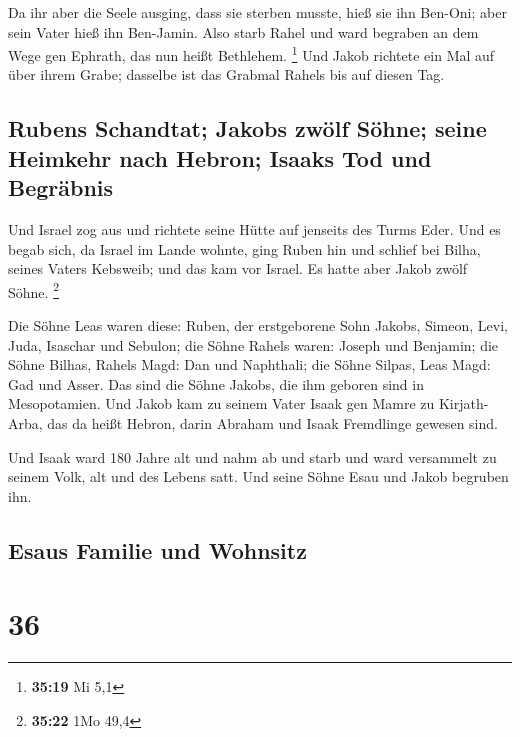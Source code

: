  Da ihr aber die Seele ausging, dass sie sterben musste,
hieß sie ihn Ben-Oni; aber sein Vater hieß ihn Ben-Jamin.
 Also starb Rahel und ward begraben an dem Wege gen
Ephrath, das nun heißt Bethlehem. \footnote{\textbf{35:19} Mi 5,1}
 Und Jakob richtete ein Mal auf über ihrem Grabe;
dasselbe ist das Grabmal Rahels bis auf diesen Tag.

\hypertarget{rubens-schandtat-jakobs-zwuxf6lf-suxf6hne-seine-heimkehr-nach-hebron-isaaks-tod-und-begruxe4bnis}{%
\subsection{Rubens Schandtat; Jakobs zwölf Söhne; seine Heimkehr nach
Hebron; Isaaks Tod und
Begräbnis}\label{rubens-schandtat-jakobs-zwuxf6lf-suxf6hne-seine-heimkehr-nach-hebron-isaaks-tod-und-begruxe4bnis}}

 Und Israel zog aus und richtete seine Hütte auf jenseits
des Turms Eder.  Und es begab sich, da Israel im Lande
wohnte, ging Ruben hin und schlief bei Bilha, seines Vaters Kebsweib;
und das kam vor Israel. Es hatte aber Jakob zwölf Söhne. \footnote{\textbf{35:22}
  1Mo 49,4}

 Die Söhne Leas waren diese: Ruben, der erstgeborene Sohn
Jakobs, Simeon, Levi, Juda, Isaschar und Sebulon;  die
Söhne Rahels waren: Joseph und Benjamin;  die Söhne
Bilhas, Rahels Magd: Dan und Naphthali;  die Söhne
Silpas, Leas Magd: Gad und Asser. Das sind die Söhne Jakobs, die ihm
geboren sind in Mesopotamien.  Und Jakob kam zu seinem
Vater Isaak gen Mamre zu Kirjath-Arba, das da heißt Hebron, darin
Abraham und Isaak Fremdlinge gewesen sind.

 Und Isaak ward 180 Jahre alt  und nahm ab
und starb und ward versammelt zu seinem Volk, alt und des Lebens satt.
Und seine Söhne Esau und Jakob begruben ihn.

\hypertarget{esaus-familie-und-wohnsitz}{%
\subsection{Esaus Familie und
Wohnsitz}\label{esaus-familie-und-wohnsitz}}

\hypertarget{section-35}{%
\section{36}\label{section-35}}


